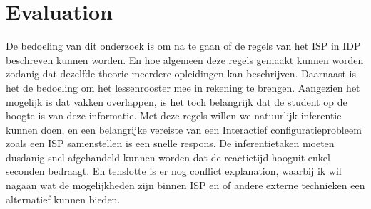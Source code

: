 \chapter{Evaluation}
\label{cha:evaluation}
De bedoeling van dit onderzoek is om na te gaan of de regels van het ISP in IDP beschreven kunnen worden. En hoe algemeen deze regels gemaakt kunnen worden zodanig dat dezelfde theorie meerdere opleidingen kan beschrijven. Daarnaast is het de bedoeling om het lessenrooster mee in rekening te brengen. Aangezien het mogelijk is dat vakken overlappen, is het toch belangrijk dat de student op de hoogte is van deze informatie. Met deze regels willen we natuurlijk inferentie kunnen doen, en een belangrijke vereiste van een Interactief configuratieprobleem zoals een ISP samenstellen is een snelle respons. De inferentietaken moeten dusdanig snel afgehandeld kunnen worden dat de reactietijd hooguit enkel seconden bedraagt. En tenslotte is er nog conflict explanation, waarbij ik wil nagaan wat de mogelijkheden zijn binnen ISP en of andere externe technieken \cite{amilhastre2002consistency} een alternatief kunnen bieden.


